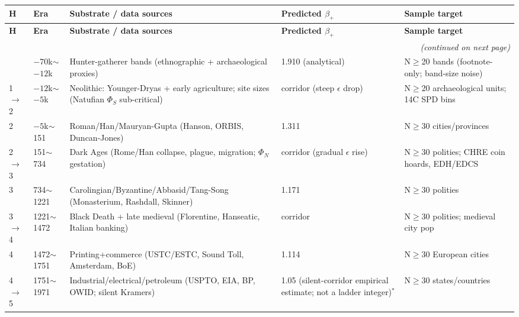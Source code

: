 \clearpage  %
{\scriptsize
\setlength{\tabcolsep}{1pt}
\renewcommand{\arraystretch}{1.1}
\begin{longtable}{p{0.6cm}p{1.7cm}p{7.5cm}p{2.2cm}p{4.0cm}}
\toprule
\textbf{H} & \textbf{Era} & \textbf{Substrate / data sources} & \textbf{Predicted $\beta_+$} & \textbf{Sample target} \\
\midrule
\endfirsthead
\toprule
\textbf{H} & \textbf{Era} & \textbf{Substrate / data sources} & \textbf{Predicted $\beta_+$} & \textbf{Sample target} \\
\midrule
\endhead
\midrule
\multicolumn{5}{r}{\footnotesize\itshape (continued on next page)} \\
\endfoot
\bottomrule
\endlastfoot
1 & $-70$k$\sim$$-12$k & Hunter-gatherer bands (ethnographic + archaeological proxies) & 1.910 (analytical) & N$\geq$20 bands (footnote-only; band-size noise) \\
1$\to$2 & $-12$k$\sim$$-5$k & Neolithic: Younger-Dryas + early agriculture; site sizes (Natufian $\Phi_S$ sub-critical) & corridor (steep $\epsilon$ drop) & N$\geq$20 archaeological units; 14C SPD bins \\
2 & $-5$k$\sim$151 & Roman/Han/Mauryan-Gupta (Hanson, ORBIS, Duncan-Jones) & 1.311 & N$\geq$30 cities/provinces \\
2$\to$3 & 151$\sim$734 & Dark Ages (Rome/Han collapse, plague, migration; $\Phi_N$ gestation) & corridor (gradual $\epsilon$ rise) & N$\geq$30 polities; CHRE coin hoards, EDH/EDCS \\
3 & 734$\sim$1221 & Carolingian/Byzantine/Abbasid/Tang-Song (Monasterium, Rashdall, Skinner) & 1.171 & N$\geq$30 polities \\
3$\to$4 & 1221$\sim$1472 & Black Death + late medieval (Florentine, Hanseatic, Italian banking) & corridor & N$\geq$30 polities; medieval city pop \\
4 & 1472$\sim$1751 & Printing+commerce (USTC/ESTC, Sound Toll, Amsterdam, BoE) & 1.114 & N$\geq$30 European cities \\
4$\to$5 & 1751$\sim$1971 & Industrial/electrical/petroleum (USPTO, EIA, BP, OWID; silent Kramers) & 1.05 (silent-corridor empirical estimate; not a ladder integer)$^{\ast}$ & N$\geq$30 states/countries \\
\end{longtable}
}


